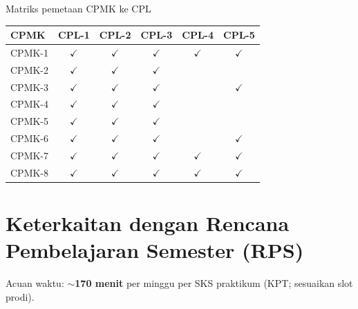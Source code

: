 \documentclass[../main.tex]{subfiles}
\begin{document}
\par\addvspace{\ModulMediaskip}
{\small
\begin{modultable}[]{Matriks pemetaan CPMK ke CPL}
\begin{tabular}{|l|c|c|c|c|c|}
\hline
\textbf{CPMK} & \textbf{CPL-1} & \textbf{CPL-2} & \textbf{CPL-3} & \textbf{CPL-4} & \textbf{CPL-5} \\
\hline
CPMK-1 & $\checkmark$ & $\checkmark$ & $\checkmark$ & $\checkmark$ & $\checkmark$ \\
CPMK-2 & $\checkmark$ & $\checkmark$ & $\checkmark$ & & \\
CPMK-3 & $\checkmark$ & $\checkmark$ & $\checkmark$ & & $\checkmark$ \\
CPMK-4 & $\checkmark$ & $\checkmark$ & $\checkmark$ & & \\
CPMK-5 & $\checkmark$ & $\checkmark$ & $\checkmark$ & & \\
CPMK-6 & $\checkmark$ & $\checkmark$ & $\checkmark$ & & $\checkmark$ \\
CPMK-7 & $\checkmark$ & $\checkmark$ & $\checkmark$ & $\checkmark$ & $\checkmark$ \\
CPMK-8 & $\checkmark$ & $\checkmark$ & $\checkmark$ & $\checkmark$ & $\checkmark$ \\
\hline
\end{tabular}
\end{modultable}
}
\addvspace{\ModulMediaskip}

\section{Keterkaitan dengan Rencana Pembelajaran Semester (RPS)}

Acuan waktu: \textbf{$\sim$170 menit} per minggu per SKS praktikum (KPT; sesuaikan slot prodi).
\end{document}
